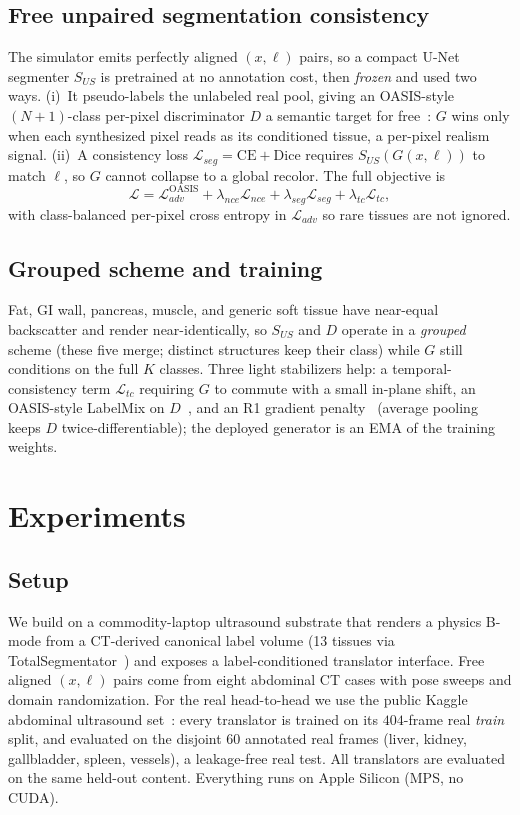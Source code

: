 \documentclass[runningheads]{llncs}
\begin{document}
\subsection{Free unpaired segmentation consistency}
The simulator emits perfectly aligned $(x,\ell)$ pairs, so a compact U-Net~\cite{ronneberger2015unet}
segmenter $S_{US}$ is pretrained at no annotation cost, then \emph{frozen} and used two ways. (i)~It
pseudo-labels the unlabeled real pool, giving an OASIS-style $(N{+}1)$-class per-pixel discriminator $D$
a semantic target for free~\cite{sushko2021oasis}: $G$ wins only when each synthesized pixel reads as
its conditioned tissue, a per-pixel realism signal. (ii)~A consistency loss
$\mathcal{L}_{seg}=\mathrm{CE}+\mathrm{Dice}$ requires $S_{US}(G(x,\ell))$ to match $\ell$, so $G$ cannot
collapse to a global recolor. The full objective is
\begin{equation}
\mathcal{L}=\mathcal{L}_{adv}^{\text{OASIS}}+\lambda_{nce}\mathcal{L}_{nce}
+\lambda_{seg}\mathcal{L}_{seg}+\lambda_{tc}\mathcal{L}_{tc},
\end{equation}
with class-balanced per-pixel cross entropy in $\mathcal{L}_{adv}$ so rare tissues are not ignored.

\subsection{Grouped scheme and training}
Fat, GI wall, pancreas, muscle, and generic soft tissue have near-equal backscatter and render
near-identically, so $S_{US}$ and $D$ operate in a \emph{grouped} scheme (these five merge; distinct
structures keep their class) while $G$ still conditions on the full $K$ classes. Three light stabilizers
help: a temporal-consistency term $\mathcal{L}_{tc}$ requiring $G$ to commute with a small in-plane
shift, an OASIS-style LabelMix on $D$~\cite{yun2019cutmix}, and an R1 gradient
penalty~\cite{mescheder2018r1} (average pooling keeps $D$ twice-differentiable); the deployed generator
is an EMA of the training weights.

\section{Experiments}
\subsection{Setup}
We build on a commodity-laptop ultrasound substrate that renders a physics B-mode from a CT-derived
canonical label volume (13 tissues via TotalSegmentator~\cite{wasserthal2023totalseg}) and exposes a
label-conditioned translator interface. Free aligned $(x,\ell)$ pairs come from eight abdominal CT
cases with pose sweeps and domain randomization. For the real head-to-head we use the public Kaggle
abdominal ultrasound set~\cite{vitale2020realism}: every translator is trained on its $404$-frame real
\emph{train} split, and evaluated on the disjoint $60$ annotated real frames (liver, kidney,
gallbladder, spleen, vessels), a leakage-free real test. All translators are evaluated on the same
held-out content. Everything runs on Apple Silicon (MPS, no CUDA).
\end{document}
